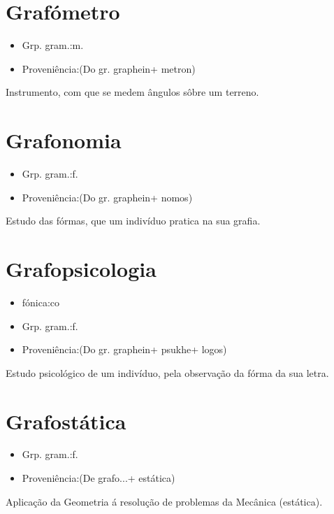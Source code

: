 \section{Grafómetro}
\begin{itemize}
\item {Grp. gram.:m.}
\end{itemize}
\begin{itemize}
\item {Proveniência:(Do gr. \textunderscore graphein\textunderscore  + \textunderscore metron\textunderscore )}
\end{itemize}
Instrumento, com que se medem ângulos sôbre um terreno.
\section{Grafonomia}
\begin{itemize}
\item {Grp. gram.:f.}
\end{itemize}
\begin{itemize}
\item {Proveniência:(Do gr. \textunderscore graphein\textunderscore  + \textunderscore nomos\textunderscore )}
\end{itemize}
Estudo das fórmas, que um indivíduo pratica na sua grafia.
\section{Grafopsicologia}
\begin{itemize}
\item {fónica:co}
\end{itemize}
\begin{itemize}
\item {Grp. gram.:f.}
\end{itemize}
\begin{itemize}
\item {Proveniência:(Do gr. \textunderscore graphein\textunderscore  + \textunderscore psukhe\textunderscore  + \textunderscore logos\textunderscore )}
\end{itemize}
Estudo psicológico de um indivíduo, pela observação da fórma da sua letra.
\section{Grafostática}
\begin{itemize}
\item {Grp. gram.:f.}
\end{itemize}
\begin{itemize}
\item {Proveniência:(De \textunderscore grafo...\textunderscore  + \textunderscore estática\textunderscore )}
\end{itemize}
Aplicação da Geometria á resolução de problemas da Mecânica (estática).
